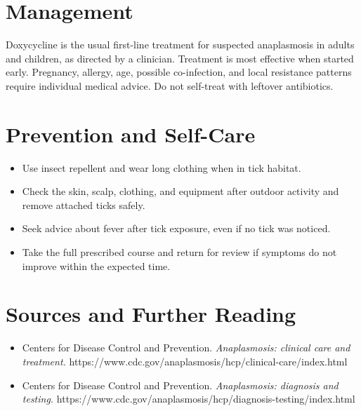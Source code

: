 \section*{Management}
Doxycycline is the usual first-line treatment for suspected anaplasmosis in adults and children, as directed by a clinician. Treatment is most effective when started early. Pregnancy, allergy, age, possible co-infection, and local resistance patterns require individual medical advice. Do not self-treat with leftover antibiotics.

\section*{Prevention and Self-Care}
\begin{itemize}
    \item Use insect repellent and wear long clothing when in tick habitat.
    \item Check the skin, scalp, clothing, and equipment after outdoor activity and remove attached ticks safely.
    \item Seek advice about fever after tick exposure, even if no tick was noticed.
    \item Take the full prescribed course and return for review if symptoms do not improve within the expected time.
\end{itemize}

\section*{Sources and Further Reading}
\begin{itemize}
    \item Centers for Disease Control and Prevention. \textit{Anaplasmosis: clinical care and treatment.} https://www.cdc.gov/anaplasmosis/hcp/clinical-care/index.html
    \item Centers for Disease Control and Prevention. \textit{Anaplasmosis: diagnosis and testing.} https://www.cdc.gov/anaplasmosis/hcp/diagnosis-testing/index.html
\end{itemize}
